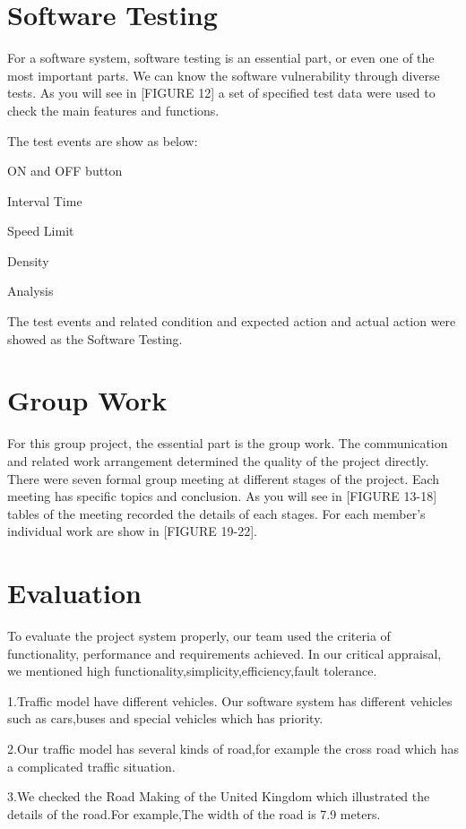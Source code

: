 \documentclass[12pt]{amsart}
\begin{document}
\section{Software Testing}
For a software system, software testing is an essential part, or even one of the most important parts. We can know the software vulnerability through diverse tests. As you will see in [FIGURE 12] a set of specified test data were used to check the main features and functions.

The test events are show as below:

ON and OFF button

Interval Time

Speed Limit

Density

Analysis

The test events and related condition and expected action and actual action were showed as the Software Testing.

\section{Group Work}
For this group project, the essential part is the group work. The communication and related work arrangement determined the quality of the project directly. There were seven formal group meeting at different stages of the project. Each meeting has specific topics and conclusion. As you will see in [FIGURE 13-18] tables of the meeting recorded the details of each stages. For each member's individual work are show in [FIGURE 19-22].

\section{Evaluation}
To evaluate the project system properly, our team used the criteria of functionality, performance and requirements achieved. In our critical appraisal, we mentioned high functionality,simplicity,efficiency,fault tolerance.

1.Traffic model have different vehicles. Our software system has different vehicles such as cars,buses and special vehicles which has priority.

2.Our traffic model has several kinds of road,for example the cross road which has a complicated traffic situation.

3.We checked the Road Making of the United Kingdom which illustrated the details of the road.For example,The width of the road is 7.9 meters.
\end{document}
